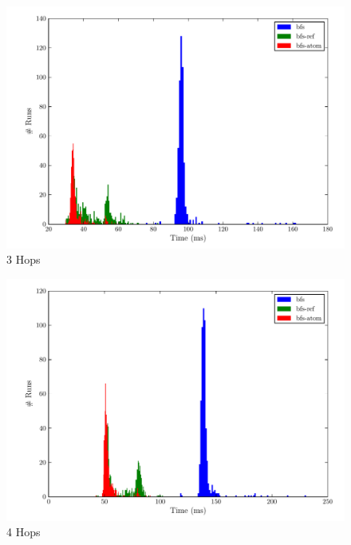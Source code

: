 \documentclass[12pt,letterpaper,oneside]{report}
\theoremstyle{definition}
\begin{document}
		\begin{figure}[!ht]
			\centering
			\includegraphics[scale=0.85]{3_hops}
			\caption{3 Hops}
			\label{fig:perf-3-hops}
		\end{figure}
		
		\begin{figure}[!ht]
			\centering
			\includegraphics[scale=0.85]{4_hops}
			\caption{4 Hops}
			\label{fig:perf-4-hops}
		\end{figure}
		
\end{document}
